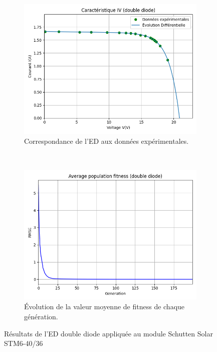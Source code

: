\begin{figure}
    \centering
    \begin{subfigure}[b]{0.45\textwidth}
        \includegraphics[width=\textwidth]{resources/STM6/doubled/iv.png}
        \caption{Correspondance de l'ED aux données expérimentales.}
    \end{subfigure}
    ~
    \begin{subfigure}[b]{0.45\textwidth}
        \includegraphics[width=\textwidth]{resources/STM6/doubled/fitness.png}
        \caption{Évolution de la valeur moyenne de fitness de chaque génération.}
    \end{subfigure}
    \caption{Résultats de l'ED double diode appliquée au module Schutten Solar STM6-40/36}
    \label{fig:STMdoublecarac}
\end{figure}%
